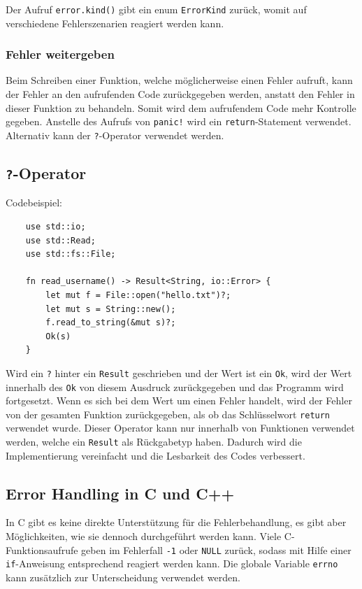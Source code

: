 Der Aufruf \verb"error.kind()" gibt ein enum \verb"ErrorKind" zurück, womit auf verschiedene Fehlerszenarien reagiert werden kann.

\subsubsection{Fehler weitergeben}

Beim Schreiben einer Funktion, welche möglicherweise einen Fehler aufruft, kann der Fehler an den aufrufenden Code zurückgegeben werden, anstatt den Fehler in dieser Funktion zu behandeln. Somit wird dem aufrufendem Code mehr Kontrolle gegeben. Anstelle des Aufrufs von \verb"panic!" wird ein \verb"return"-Statement verwendet. Alternativ kann der \verb"?"-Operator verwendet werden.

\subsection{\texttt{?}-Operator}

Codebeispiel:

\begin{lstlisting}
    use std::io;
    use std::Read;
    use std::fs::File;

    fn read_username() -> Result<String, io::Error> {
        let mut f = File::open("hello.txt")?;
        let mut s = String::new();
        f.read_to_string(&mut s)?;
        Ok(s)
    }
\end{lstlisting}

Wird ein \verb"?" hinter ein \verb"Result" geschrieben und der Wert ist ein \verb"Ok", wird der Wert innerhalb des \verb"Ok" von diesem Ausdruck zurückgegeben und das Programm wird fortgesetzt. Wenn es sich bei dem Wert um einen Fehler handelt, wird der Fehler von der gesamten Funktion zurückgegeben, als ob das Schlüsselwort \verb"return" verwendet wurde. Dieser Operator kann nur innerhalb von Funktionen verwendet werden, welche ein \verb"Result" als Rückgabetyp haben. Dadurch wird die Implementierung vereinfacht und die Lesbarkeit des Codes verbessert.

\subsection{Error Handling in C und C++}

In C gibt es keine direkte Unterstützung für die Fehlerbehandlung, es gibt aber Möglichkeiten, wie sie dennoch durchgeführt werden kann. Viele C-Funk\-ti\-ons\-auf\-ru\-fe geben im Fehlerfall \verb"-1" oder \verb"NULL" zurück, sodass mit Hilfe einer \verb"if"-Anweisung entsprechend reagiert werden kann. Die globale Variable \verb"errno" kann zusätzlich zur Unterscheidung verwendet werden.

